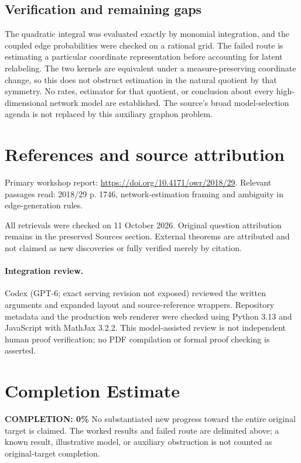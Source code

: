 \documentclass[11pt]{article}
\begin{document}
\subsection{Verification and remaining gaps}
The quadratic integral was evaluated exactly by monomial integration, and the coupled edge probabilities were checked on a rational grid. The failed route is estimating a particular coordinate representation before accounting for latent relabeling. The two kernels are equivalent under a measure-preserving coordinate change, so this does not obstruct estimation in the natural quotient by that symmetry. No rates, estimator for that quotient, or conclusion about every high-dimensional network model are established. The source's broad model-selection agenda is not replaced by this auxiliary graphon problem.

\section{References and source attribution}
Primary workshop report: \url{https://doi.org/10.4171/owr/2018/29}. Relevant passages read: 2018/29 p. 1746, network-estimation framing and ambiguity in edge-generation rules.

All retrievals were checked on 11 October 2026. Original question attribution remains in the preserved Sources section. External theorems are attributed and not claimed as new discoveries or fully verified merely by citation.


\paragraph{Integration review.} Codex (GPT-6; exact serving revision not exposed) reviewed the written arguments and expanded layout and source-reference wrappers. Repository metadata and the production web renderer were checked using Python 3.13 and JavaScript with MathJax 3.2.2. This model-assisted review is not independent human proof verification; no PDF compilation or formal proof checking is asserted.

\section{Completion Estimate}
\noindent\textbf{COMPLETION: 0\%}
No substantiated new progress toward the entire original target is claimed. The worked results and failed route are delimited above; a known result, illustrative model, or auxiliary obstruction is not counted as original-target completion.
\end{document}
